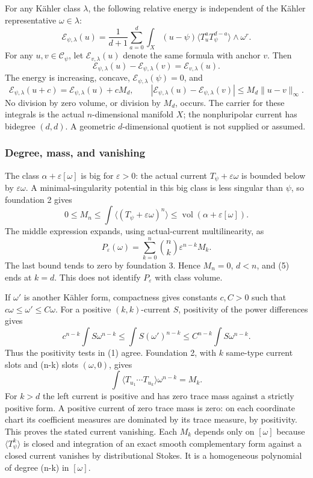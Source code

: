 \documentclass[
  11pt,
]{article}
\begin{document}
For any Kähler class \(\lambda\), the following relative energy is
independent of the Kähler representative \(\omega\in\lambda\): \[
\mathcal E_{\psi,\lambda}(u)
=\frac1{d+1}\sum_{a=0}^d\int_X(u-\psi)
\langle T_u^aT_\psi^{d-a}\rangle\wedge\omega^r.
\tag{2}
\] For any \(u,v\in\mathcal C_\psi\), let \(\mathcal E_{v,\lambda}(u)\)
denote the same formula with anchor \(v\). Then \[
\mathcal E_{\psi,\lambda}(u)-\mathcal E_{\psi,\lambda}(v)
=\mathcal E_{v,\lambda}(u).
\tag{3}
\] The energy is increasing, concave,
\(\mathcal E_{\psi,\lambda}(\psi)=0\), and \[
\mathcal E_{\psi,\lambda}(u+c)=\mathcal E_{\psi,\lambda}(u)+cM_d,
\qquad
|\mathcal E_{\psi,\lambda}(u)-\mathcal E_{\psi,\lambda}(v)|
\leq M_d\|u-v\|_\infty.
\tag{4}
\] No division by zero volume, or division by \(M_d\), occurs. The
carrier for these integrals is the actual \(n\)-dimensional manifold
\(X\); the nonpluripolar current has bidegree \((d,d)\). A geometric
\(d\)-dimensional quotient is not supplied or assumed.

\subsubsection{Degree, mass, and
vanishing}\label{degree-mass-and-vanishing}

The class \(\alpha+\varepsilon[\omega]\) is big for \(\varepsilon>0\):
the actual current \(T_\psi+\varepsilon\omega\) is bounded below by
\(\varepsilon\omega\). A minimal-singularity potential in this big class
is less singular than \(\psi\), so foundation 2 gives \[
0\leq M_n\leq\int\langle(T_\psi+\varepsilon\omega)^n\rangle
\leq\operatorname{vol}(\alpha+\varepsilon[\omega]).
\] The middle expression expands, using actual-current multilinearity,
as \[
P_\varepsilon(\omega)=\sum_{k=0}^n\binom nk\varepsilon^{n-k}M_k.
\tag{5}
\] The last bound tends to zero by foundation 3. Hence \(M_n=0\),
\(d<n\), and (5) ends at \(k=d\). This does not identify
\(P_\varepsilon\) with class volume.

If \(\omega'\) is another Kähler form, compactness gives constants
\(c,C>0\) such that \(c\omega\leq\omega'\leq C\omega\). For a positive
\((k,k)\)-current \(S\), positivity of the power differences gives \[
c^{n-k}\int S\omega^{n-k}\leq\int S(\omega')^{n-k}\leq C^{n-k}\int S\omega^{n-k}.
\] Thus the positivity tests in (1) agree. Foundation 2, with \(k\)
same-type current slots and (n-k) slots \((\omega,0)\), gives \[
\int\langle T_{u_1}\cdots T_{u_k}\rangle\omega^{n-k}=M_k.
\tag{6}
\] For \(k>d\) the left current is positive and has zero trace mass
against a strictly positive form. A positive current of zero trace mass
is zero: on each coordinate chart its coefficient measures are dominated
by its trace measure, by positivity. This proves the stated current
vanishing. Each \(M_k\) depends only on \([\omega]\) because
\(\langle T_\psi^k\rangle\) is closed and integration of an exact smooth
complementary form against a closed current vanishes by distributional
Stokes. It is a homogeneous polynomial of degree (n-k) in \([\omega]\).
\end{document}

